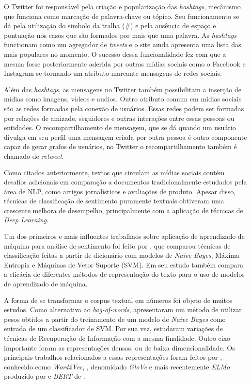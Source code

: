 O Twitter foi responsável pela criação e popularização das \textit{hashtags},
mecânismo que funciona como marcação de palavra-chave ou tópico.
Seu funcionamento se dá pela utilização do simbolo da tralha (\#) e pela ausência
de espaço e pontuação nos casos que são formados por mais que uma palavra.
As \textit{hashtags} functionam como um agregador de \textit{tweets} e o site
ainda apresenta uma lista das mais populares no momento.
O sucesso dessa funcionalidade fez com que a mesma fosse posteriormente aderida
por outras mídias sociais como o Facebook e Instagram se tornando um
atributo marcante mensagens de redes sociais.

Além das \textit{hashtags}, as mensagens no Twitter também possibilitam a
inserção de mídias como imagens, vídeos e audios.
Outro atributo comum em mídias sociais são as redes formadas pela conexão de
usuários.
Essas redes podem ser formadas por relações de amizade, seguidores e outras
interações entre essas pessoas ou entidades.
O recompartilhamento de mensagem, que se dá quando um usuário divulga em seu
perfil uma mensagem criada por outra pessoa é outro componente capaz de gerar
grafos de usuários, no Twitter o recompartilhamento também é chamado de
\textit{retweet}.

Como citados anteriormente, textos que circulam as mídias sociais contém
desafios adicionais em comparação a documentos tradicionalmente estudados pela
área de NLP, como artigos jornalísticos e avaliações de produto.
Apesar disso, técnicas de classificação de sentimento puramente textuais
obtiveram uma crescente melhora de desempelho, principalmente com a aplicação de
técnicas de \textit{Deep Learning}.

Um dos primeiros e mais influentes trabalhaos sobre aplicação de aprendizado de
máquina para análise de sentimento foi feito por \citet{pang02}, que comparou
técnicas de classificação feitas a partir de dicionário com modelos de
\textit{Naive Bayes}, Máxima Entropia e Máquinas de Vetor Suporte (SVM).
Em seu estudo \citet{pang02} também compara a eficácia de diferentes métodos de
representação do texto para o uso de modelos de aprendizado de máquina.


A forma de se transformar o corpus textual em números foi objeto de muitos
estudos.
Como alternativa ao \textit{bag-of-words}, \citet{wang12} apresentaram um método
de utilizar pesos obtidos a partir do treinamento de um modelo de
\textit{Naive Bayes} como entrada de um classificador de SVM.
Por sua vez, \citet{paltoglou10} estudaram variações de técnicas de Recuperação
de Informação com a mesma finalidade.
Outro eixo importante foram as representações densas, ou de baixa
dimensionalidade.
Os principais trabalhos relacionados a essas representações foram feitos por
\citet{mikolov13}, conhecido como \textit{Word2Vec}, \citet{pennington14},
denomidado \textit{GloVe} e mais recentemente \textit{ELMo} produzido por
\citet{peters18} e \textit{BERT} de \citet{devlin18}.

